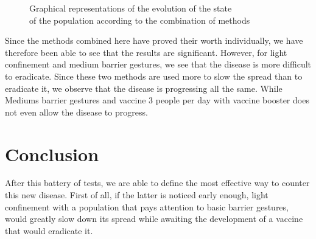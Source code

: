 \documentclass[a4paper, 12pt]{report}
\begin{document}
\begin{figure}[h]
	\caption{Graphical representations of the evolution of the state \\ of the population according to the combination of methods}
\end{figure}

Since the methods combined here have proved their worth individually, we have therefore been able to see that the results are significant. However, for light confinement and medium barrier gestures, we see
that the disease is more difficult to eradicate. Since these two methods are used more to slow the spread than to eradicate it, we observe that the disease is progressing all the same.
While Mediums barrier gestures and vaccine 3 people per day with vaccine booster does not even allow the disease to progress.

\newpage

\section{Conclusion}

After this battery of tests, we are able to define the most effective way to counter this new disease. First of all, if the latter is noticed early enough,
light confinement with a population that pays attention to basic barrier gestures, would greatly slow down its spread while awaiting the development of a vaccine that would eradicate it.
\end{document}
